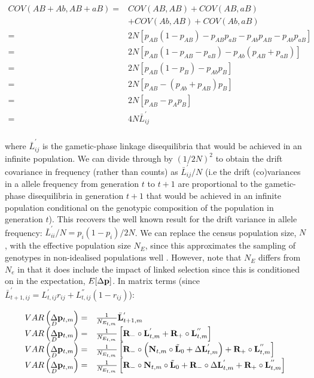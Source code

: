 \documentclass[12pt]{article}
\begin{document}
\begin{bibunit}
\begin{equation}
\begin{array}{rl}
COV(AB+Ab, AB+aB) =& COV(AB, AB)+COV(AB, aB)\\
&+COV(Ab, AB)+COV(Ab, aB)\\
=& 2N\left[p_{AB}(1-p_{AB})-p_{AB}p_{aB}-p_{Ab}p_{AB}-p_{Ab}p_{aB}\right]\\
=& 2N\left[p_{AB}(1-p_{AB}-p_{aB})-p_{Ab}(p_{AB}+p_{aB})\right]\\
=& 2N\left[p_{AB}(1-p_{B})-p_{Ab}p_{B}\right]\\
=& 2N\left[p_{AB}-(p_{Ab}+p_{AB})p_{B}\right]\\
=& 2N\left[p_{AB}-p_{A}p_{B}\right]\\
=& 4N\bar{L}^{'}_{ij}\\
\end{array}
\end{equation}

where $\bar{L}^{'}_{ij}$ is the gametic-phase linkage disequilibria that would be achieved in an infinite population. We can divide through by $(1/2N)^2$ to obtain the drift covariance in frequency (rather than counts) as $\bar{L}^{'}_{ij}/N$ (i.e the drift (co)variances in a allele frequency from generation $t$ to $t+1$ are proportional to the gametic-phase disequilibria in generation $t+1$ that would be achieved in an infinite population conditional on the genotypic composition of the population in generation $t$). This recovers the well known result for the drift variance in allele frequency: $\bar{L}^{'}_{ii}/N = p_i(1-p_i)/2N$. We can replace the census population size, $N$, with the effective population size $N_E$, since this approximates the sampling of genotypes in non-idealised populations well \citep{ethier1980diffusion}. However, note that $N_E$ differs from $N_e$ in that it does include the impact of linked selection since this is conditioned on in the expectation, $E[\Delta{\bf p}]$. In matrix terms (since $\bar{L}^{'}_{{t+1},ij}=L^{'}_{t,ij}r_{ij}+L^{''}_{t,ij}(1-r_{ij})$):

\begin{equation}
\begin{array}{rl}
VAR\left(\underset{D}\Delta {\bf p}_{t,m}\right) =& \frac{1}{N_{E_{t,m}}} \bar{\bf L}^{'}_{t+1,m}\\
VAR\left(\underset{D}\Delta {\bf p}_{t,m}\right) =& \frac{1}{N_{E_{t,m}}}\left[{\bf R}_{-}\circ{\bf L}^{'}_{t,m}+{\bf R}_{+}\circ{\bf L}^{''}_{t, m}\right]\\

VAR\left(\underset{D}\Delta {\bf p}_{t,m}\right) =& \frac{1}{N_{E_{t,m}}}\left[{\bf R}_{-}\circ\left({\bf N}_{t, m}\circ\tilde{\bf L}_{0}+\Delta {\bf L}^{'}_{t, m}\right)+{\bf R}_{+}\circ{\bf L}^{''}_{t, m} \right]\\
VAR\left(\underset{D}\Delta {\bf p}_{t,m}\right) =& \frac{1}{N_{E_{t,m}}}\left[{\bf R}_{-}\circ{\bf N}_{t, m}\circ\tilde{\bf L}_{0}+{\bf R}_{-}\circ\Delta {\bf L}^{'}_{t, m}+{\bf R}_{+}\circ{\bf L}^{''}_{t, m} \right]\\
\label{eq:drift_var}
\end{array}
\end{equation}


\end{bibunit}
\end{document}

